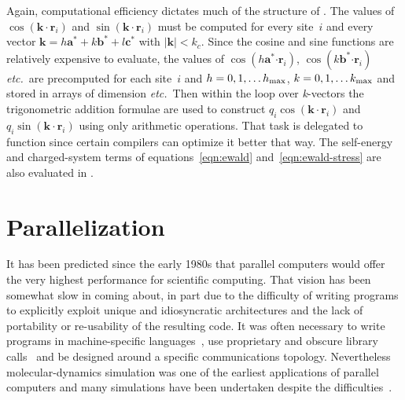 \documentclass[a4paper,twoside]{report}
\newcommand{\bm}[1]{\mathbf{#1}}
\newcommand{\etc}{\emph{etc.}}
\begin{document}
Again, computational efficiency dictates much of the structure of
.  The values of $\cos(\bm{k \cdot r}_i)$ and $\sin(\bm{k
  \cdot r}_i)$ must be computed for every site~$i$ and every vector
$\bm{k} = h \bm{a}^* + k \bm{b}^* + l \bm{c}^*$ with $|\bm{k}| < k_c$.
Since the cosine and sine functions are relatively expensive to
evaluate, the values of $\cos(h \bm{a}^*\bm{ \cdot r}_i)$, $\cos(k
\bm{b}^*\bm{ \cdot r}_i)$ \etc\ are precomputed for each site~$i$ and
$h = 0, 1, \ldots h_{\textnormal{max}}$, $k = 0, 1, \ldots
k_{\textnormal{max}}$ and stored in arrays of dimension
\Lit{[hmax][nsites]} \etc\ Then within the loop over \emph{k}-vectors
the trigonometric addition formulae are used to construct $q_i
\cos(\bm{k \cdot r}_i)$ and $q_i \sin(\bm{k \cdot r}_i)$ using only
arithmetic operations.  That task is delegated to function
 since certain compilers can optimize it better that
way.  The self-energy and charged-system terms of
equations~\ref{eqn:ewald} and~\ref{eqn:ewald-stress} are also
evaluated in .

\section{Parallelization}%
It has been predicted since the early 1980s that parallel computers
would offer the very highest performance for scientific computing.
That vision has been somewhat slow in coming about, in part due to the
difficulty of writing programs to explicitly exploit unique and
idiosyncratic architectures and the lack of portability or
re-usability of the resulting code.  It was often necessary to write
programs in machine-specific languages~\cite{pawley:82,bowler:87}, use
proprietary and obscure library calls~\cite{clementi:85} and be
designed around a specific communications topology.  Nevertheless
molecular-dynamics simulation was one of the earliest applications of
parallel computers and many simulations have been undertaken despite
the difficulties~\cite{pawley:82,clementi:85,rapaport:88}.
\end{document}
